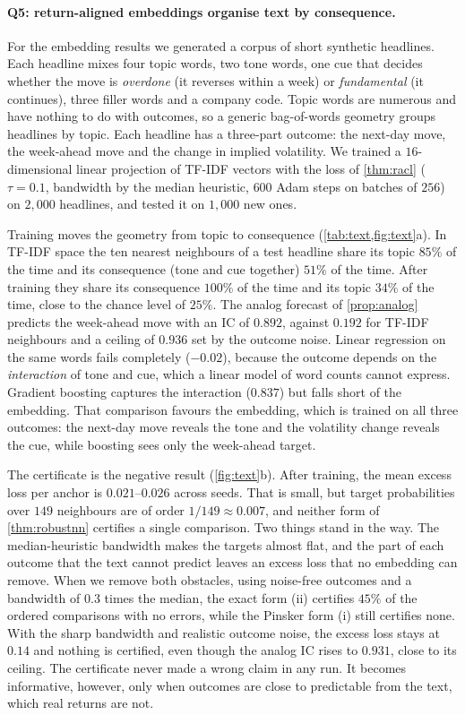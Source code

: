 \documentclass[11pt,a4paper]{article}
\theoremstyle{plain}
\theoremstyle{definition}
\theoremstyle{remark}
\begin{document}
\paragraph{Q5: return-aligned embeddings organise text by consequence.} For the embedding results we generated a corpus of short synthetic headlines. Each headline mixes four topic words, two tone words, one cue that decides whether the move is \emph{overdone} (it reverses within a week) or \emph{fundamental} (it continues), three filler words and a company code. Topic words are numerous and have nothing to do with outcomes, so a generic bag-of-words geometry groups headlines by topic. Each headline has a three-part outcome: the next-day move, the week-ahead move and the change in implied volatility. We trained a $16$-dimensional linear projection of TF-IDF vectors with the loss of \cref{thm:racl} ($\tau=0.1$, bandwidth by the median heuristic, $600$ Adam steps on batches of $256$) on $2{,}000$ headlines, and tested it on $1{,}000$ new ones.

Training moves the geometry from topic to consequence (\cref{tab:text,fig:text}a). In TF-IDF space the ten nearest neighbours of a test headline share its topic $85\%$ of the time and its consequence (tone and cue together) $51\%$ of the time. After training they share its consequence $100\%$ of the time and its topic $34\%$ of the time, close to the chance level of $25\%$. The analog forecast of \cref{prop:analog} predicts the week-ahead move with an IC of $0.892$, against $0.192$ for TF-IDF neighbours and a ceiling of $0.936$ set by the outcome noise. Linear regression on the same words fails completely ($-0.02$), because the outcome depends on the \emph{interaction} of tone and cue, which a linear model of word counts cannot express. Gradient boosting captures the interaction ($0.837$) but falls short of the embedding. That comparison favours the embedding, which is trained on all three outcomes: the next-day move reveals the tone and the volatility change reveals the cue, while boosting sees only the week-ahead target.

The certificate is the negative result (\cref{fig:text}b). After training, the mean excess loss per anchor is $0.021$--$0.026$ across seeds. That is small, but target probabilities over $149$ neighbours are of order $1/149\approx0.007$, and neither form of \cref{thm:robustnn} certifies a single comparison. Two things stand in the way. The median-heuristic bandwidth makes the targets almost flat, and the part of each outcome that the text cannot predict leaves an excess loss that no embedding can remove. When we remove both obstacles, using noise-free outcomes and a bandwidth of $0.3$ times the median, the exact form (ii) certifies $45\%$ of the ordered comparisons with no errors, while the Pinsker form (i) still certifies none. With the sharp bandwidth and realistic outcome noise, the excess loss stays at $0.14$ and nothing is certified, even though the analog IC rises to $0.931$, close to its ceiling. The certificate never made a wrong claim in any run. It becomes informative, however, only when outcomes are close to predictable from the text, which real returns are not.
\end{document}
